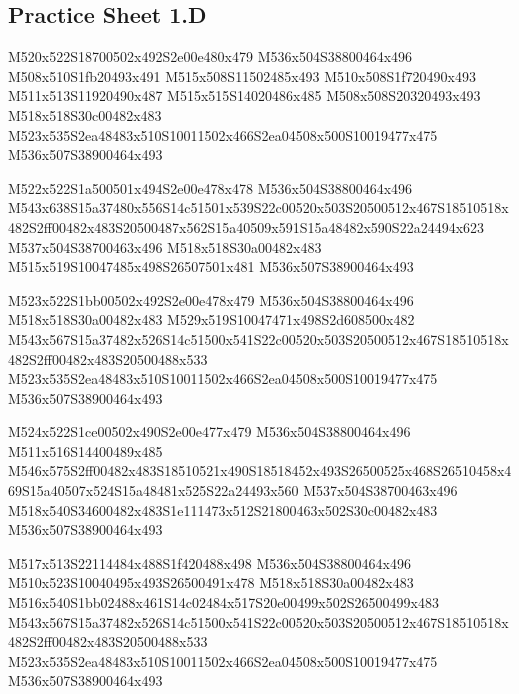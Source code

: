 \documentclass{article}
\begin{document}
\subsection{Practice Sheet 1.D}
\begin{multicols}{5}
\begin{center}

M520x522S18700502x492S2e00e480x479 %
M536x504S38800464x496 %
M508x510S1fb20493x491 %
M515x508S11502485x493 %
M510x508S1f720490x493 %
M511x513S11920490x487 %
M515x515S14020486x485 %
M508x508S20320493x493 %
M518x518S30c00482x483 %
M523x535S2ea48483x510S10011502x466S2ea04508x500S10019477x475 %
M536x507S38900464x493 %
\vfil
\columnbreak

M522x522S1a500501x494S2e00e478x478 %
M536x504S38800464x496 %
M543x638S15a37480x556S14c51501x539S22c00520x503S20500512x467S18510518x482S2ff00482x483S20500487x562S15a40509x591S15a48482x590S22a24494x623 %
M537x504S38700463x496 %
M518x518S30a00482x483 %
M515x519S10047485x498S26507501x481 %
M536x507S38900464x493 %
\vfil
\columnbreak

M523x522S1bb00502x492S2e00e478x479 %
M536x504S38800464x496 %
M518x518S30a00482x483 %
M529x519S10047471x498S2d608500x482 %
M543x567S15a37482x526S14c51500x541S22c00520x503S20500512x467S18510518x482S2ff00482x483S20500488x533 %
M523x535S2ea48483x510S10011502x466S2ea04508x500S10019477x475 %
M536x507S38900464x493 %
\vfil
\columnbreak

M524x522S1ce00502x490S2e00e477x479 %
M536x504S38800464x496 %
M511x516S14400489x485 %
M546x575S2ff00482x483S18510521x490S18518452x493S26500525x468S26510458x469S15a40507x524S15a48481x525S22a24493x560 %
M537x504S38700463x496 %
M518x540S34600482x483S1e111473x512S21800463x502S30c00482x483 %
M536x507S38900464x493 %
\vfil
\columnbreak

M517x513S22114484x488S1f420488x498 %
M536x504S38800464x496 %
M510x523S10040495x493S26500491x478 %
M518x518S30a00482x483 %
M516x540S1bb02488x461S14c02484x517S20e00499x502S26500499x483 %
M543x567S15a37482x526S14c51500x541S22c00520x503S20500512x467S18510518x482S2ff00482x483S20500488x533 %
M523x535S2ea48483x510S10011502x466S2ea04508x500S10019477x475 %
M536x507S38900464x493 %
\vfil

\end{center}
\end{multicols}
\end{document}
